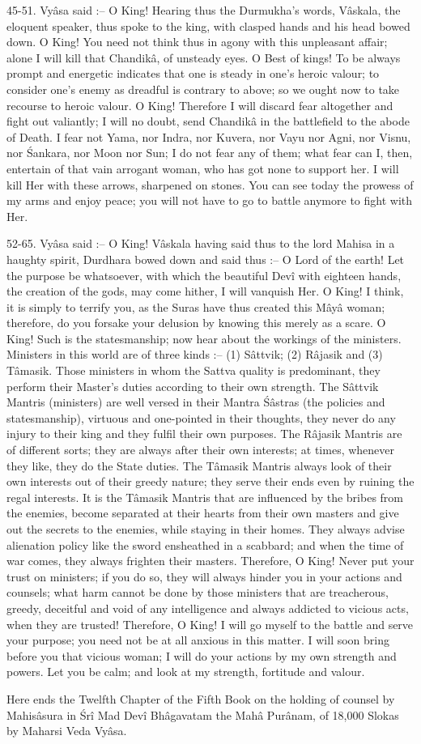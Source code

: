 45-51. Vy\^asa said :-- O King! Hearing thus the Durmukha's words, V\^askala, the eloquent speaker, thus spoke to the king, with clasped hands and his head bowed down. O King! You need not think thus in agony with this unpleasant affair; alone I will kill that Chandik\^a, of unsteady eyes. O Best of kings! To be always prompt and energetic indicates that one is steady in one's heroic valour; to consider one's enemy as dreadful is contrary to above; so we ought now to take recourse to heroic valour. O King! Therefore I will discard fear altogether and fight out valiantly; I will no doubt, send Chandik\^a in the battlefield to the abode of Death. I fear not Yama, nor Indra, nor Kuvera, nor Vayu nor Agni, nor Visnu, nor \'Sankara, nor Moon nor Sun; I do not fear any of them; what fear can I, then, entertain of that vain arrogant woman, who has got none to support her. I will kill Her with these arrows, sharpened on stones. You can see today the prowess of my arms and enjoy peace; you will not have to go to battle anymore to fight with Her.

52-65. Vy\^asa said :-- O King! V\^askala having said thus to the lord Mahisa in a haughty spirit, Durdhara bowed down and said thus :-- O Lord of the earth! Let the purpose be whatsoever, with which the beautiful Dev\^i with eighteen hands, the creation of the gods, may come hither, I will vanquish Her. O King! I think, it is simply to terrify you, as the Suras have thus created this M\^ay\^a woman; therefore, do you forsake your delusion by knowing this merely as a scare. O King! Such is the statesmanship; now hear about the workings of the ministers. Ministers in this world are of three kinds :-- (1) S\^attvik; (2) R\^ajasik and (3) T\^amasik. Those ministers in whom the Sattva quality is predominant, they perform their Master's duties according to their own strength. The S\^attvik Mantris (ministers) are well versed in their Mantra \'S\^astras (the policies and statesmanship), virtuous and one-pointed in their thoughts, they never do any injury to their king and they fulfil their own purposes. The R\^ajasik Mantris are of different sorts; they are always after their own interests; at times, whenever they like, they do the State duties. The T\^amasik Mantris always look of their own interests out of their greedy nature; they serve their ends even by ruining the regal interests. It is the T\^amasik Mantris that are influenced by the bribes from the enemies, become separated at their hearts from their own masters and give out the secrets to the enemies, while staying in their homes. They always advise alienation policy like the sword ensheathed in a scabbard; and when the time of war comes, they always frighten their masters. Therefore, O King! Never put your trust on ministers; if you do so, they will always hinder you in your actions and counsels; what harm cannot be done by those ministers that are treacherous, greedy, deceitful and void of any intelligence and always addicted to vicious acts, when they are trusted! Therefore, O King! I will go myself to the battle and serve your purpose; you need not be at all anxious in this matter. I will soon bring before you that vicious woman; I will do your actions by my own strength and powers. Let you be calm; and look at my strength, fortitude and valour.

Here ends the Twelfth Chapter of the Fifth Book on the holding of counsel by Mahis\^asura in \'Sr\^i Mad Dev\^i Bh\^agavatam the Mah\^a Pur\^anam, of 18,000 Slokas by Maharsi Veda Vy\^asa.